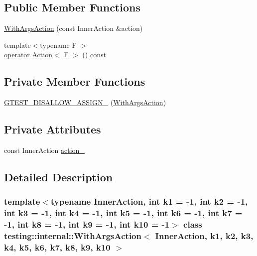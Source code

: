 \subsection*{Public Member Functions}
\begin{DoxyCompactItemize}
\item 
\hyperlink{classtesting_1_1internal_1_1WithArgsAction_ab408f9c56c8f25564ef554b984e1c926}{With\+Args\+Action} (const Inner\+Action \&action)
\item 
{\footnotesize template$<$typename F $>$ }\\\hyperlink{classtesting_1_1internal_1_1WithArgsAction_ab6d8f89fd5a54f2914da2523b2ba6ee5}{operator Action$<$ F $>$} () const
\end{DoxyCompactItemize}
\subsection*{Private Member Functions}
\begin{DoxyCompactItemize}
\item 
\hyperlink{classtesting_1_1internal_1_1WithArgsAction_a18d435ae27f0b4b00a333a74bde746dd}{G\+T\+E\+S\+T\+\_\+\+D\+I\+S\+A\+L\+L\+O\+W\+\_\+\+A\+S\+S\+I\+G\+N\+\_\+} (\hyperlink{classtesting_1_1internal_1_1WithArgsAction}{With\+Args\+Action})
\end{DoxyCompactItemize}
\subsection*{Private Attributes}
\begin{DoxyCompactItemize}
\item 
const Inner\+Action \hyperlink{classtesting_1_1internal_1_1WithArgsAction_a2afd51ea9f4b1c73e1dd7035b4dbee27}{action\+\_\+}
\end{DoxyCompactItemize}


\subsection{Detailed Description}
\subsubsection*{template$<$typename Inner\+Action, int k1 = -\/1, int k2 = -\/1, int k3 = -\/1, int k4 = -\/1, int k5 = -\/1, int k6 = -\/1, int k7 = -\/1, int k8 = -\/1, int k9 = -\/1, int k10 = -\/1$>$\newline
class testing\+::internal\+::\+With\+Args\+Action$<$ Inner\+Action, k1, k2, k3, k4, k5, k6, k7, k8, k9, k10 $>$}



